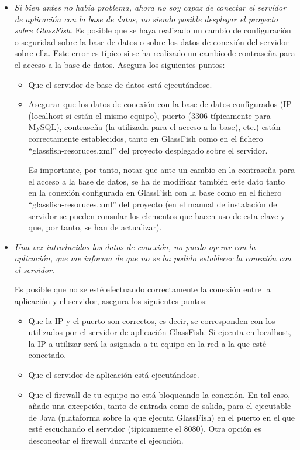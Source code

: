 \begin{itemize}
	\item \textit{Si bien antes no había problema, ahora no soy capaz de conectar el servidor de aplicación con la base de datos, no siendo posible desplegar el proyecto sobre GlassFish}. Es posible que se haya realizado un cambio de configuración o seguridad sobre la base de datos o sobre los datos de conexión del servidor sobre ella. Este error es típico si se ha realizado un cambio de contraseña para el acceso a la base de datos. Asegura los siguientes puntos:
	
	\begin{itemize}
		\item Que el servidor de base de datos está ejecutándose.
		\item Asegurar que los datos de conexión con la base de datos configurados (IP (localhost si están el mismo equipo), puerto (3306 típicamente para MySQL), contraseña (la utilizada para el acceso a la base), etc.) están correctamente establecidos, tanto en GlassFish como en el fichero ``glassfish-resoruces.xml'' del proyecto desplegado sobre el servidor. 
		
		Es importante, por tanto, notar que ante un cambio en la contraseña para el acceso a la base de datos, se ha de modificar también este dato tanto en la conexión configurada en GlassFish con la base como en el fichero ``glassfish-resoruces.xml'' del proyecto (en el manual de instalación del servidor se pueden consular los elementos que hacen uso de esta clave y que, por tanto, se han de actualizar).
	\end{itemize}
	
	\item \textit{Una vez introducidos los datos de conexión, no puedo operar con la aplicación, que me informa de que no se ha podido establecer la conexión con el servidor}.
	
	Es posible que no se esté efectuando correctamente la conexión entre la aplicación y el servidor, asegura los siguientes puntos:
	\begin{itemize}
		\item Que la IP y el puerto son correctos, es decir, se corresponden con los utilizados por el servidor de aplicación GlassFish. Si ejecuta en localhost, la IP a utilizar será la asignada a tu equipo en la red a la que esté conectado.
		\item Que el servidor de aplicación está ejecutándose.
		\item Que el firewall de tu equipo no está bloqueando la conexión. En tal caso, añade una excepción, tanto de entrada como de salida, para el ejecutable de Java (plataforma sobre la que ejecuta GlassFish) en el puerto en el que esté escuchando el servidor (típicamente el 8080). Otra opción es desconectar el firewall durante el ejecución.
	\end{itemize}
	
	
\end{itemize}

